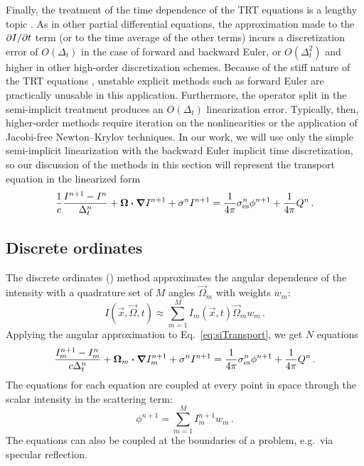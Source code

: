 Finally, the treatment of the time dependence of the TRT equations is a lengthy
topic \cite{Low2004}. As in other partial differential equations, the
approximation made to the
${\partial I}/{\partial t}$ term (or to the time average of the other terms) incurs a
discretization error of $O(\Delta_t)$ in the case of forward and backward Euler,
or $O(\Delta_t^2)$ and higher in other high-order discretization schemes.
Because of the stiff nature of the TRT equations \cite{Kno2003}, unstable explicit
methods such as forward Euler are practically unusable in this application.
Furthermore, the operator split in the semi-implicit treatment produces an
$O(\Delta_t)$ linearization error. Typically, then,
higher-order methods require iteration on the nonlinearities or the
application of Jacobi-free Newton--Krylov techniques. In our work, we will use
only the simple semi-implicit linearization with the backward Euler implicit time
discretization, so our discussion of the methods in this section will represent
the transport equation in the linearized form
\begin{equation}\label{eq:siTransport}
  \frac{1}{c} \frac{I^{n+1} - I^n}{\Delta_t^n}
  + \bm{\Omega} \bm{\cdot} \bm{\nabla} I^{n+1}
  + \sigma^n I^{n+1}
  = \frac{1}{4\pi} \sigma_\mathrm{es}^n \phi^{n+1}
  + \frac{1}{4\pi} Q^n\,.
\end{equation}

\subsection{Discrete ordinates}

The discrete ordinates (\SN) method approximates the angular dependence of the
intensity with a quadrature set of $M$ angles $\vec{\Omega}_m$ with weights $w_m$:
\begin{equation*}
  I(\vec{x},\vec{\Omega},t) \approx \sum_{m=1}^M I_m(\vec{x},t) \vec{\Omega}_m w_m\,.
\end{equation*}
Applying the angular approximation to Eq.~\eqref{eq:siTransport}, we get $N$
equations 
\begin{equation}\label{eq:siTransport}
  \frac{I_{m}^{n+1} - I_{m}^n}{c \Delta_t^n}
  + \bm{\Omega}_{m} \bm{\cdot} \bm{\nabla} I_{m}^{n+1}
  + \sigma^n I^{n+1}
  = \frac{1}{4\pi} \sigma_\mathrm{es}^n \phi^{n+1}
  + \frac{1}{4\pi} Q^n\,.
\end{equation}
The equations for each equation are coupled at every point in space through the
scalar intensity in the scattering term:
\begin{equation*}
  \phi^{n+1} = \sum_{m=1}^M I_m^{n+1} w_m \,.
\end{equation*}
The equations can also be coupled at the boundaries of a problem, e.g.~via
specular reflection.

